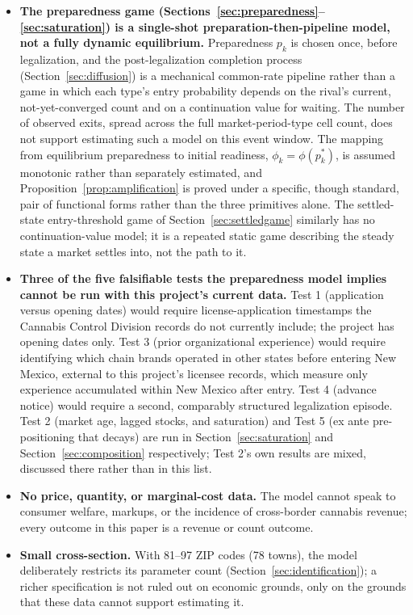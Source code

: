 \documentclass[english,12pt]{article}
\begin{document}
\begin{itemize}
\item \textbf{The preparedness game (Sections~\ref{sec:preparedness}--\ref{sec:saturation}) is a single-shot preparation-then-pipeline model, not a fully dynamic equilibrium.} Preparedness $p_k$ is chosen once, before legalization, and the post-legalization completion process (Section~\ref{sec:diffusion}) is a mechanical common-rate pipeline rather than a game in which each type's entry probability depends on the rival's current, not-yet-converged count and on a continuation value for waiting. The number of observed exits, spread across the full market-period-type cell count, does not support estimating such a model on this event window. The mapping from equilibrium preparedness to initial readiness, $\phi_k=\phi(p_k^*)$, is assumed monotonic rather than separately estimated, and Proposition~\ref{prop:amplification} is proved under a specific, though standard, pair of functional forms rather than the three primitives alone. The settled-state entry-threshold game of Section~\ref{sec:settledgame} similarly has no continuation-value model; it is a repeated static game describing the steady state a market settles into, not the path to it.
\item \textbf{Three of the five falsifiable tests the preparedness model implies cannot be run with this project's current data.} Test 1 (application versus opening dates) would require license-application timestamps the Cannabis Control Division records do not currently include; the project has opening dates only. Test 3 (prior organizational experience) would require identifying which chain brands operated in other states before entering New Mexico, external to this project's licensee records, which measure only experience accumulated within New Mexico after entry. Test 4 (advance notice) would require a second, comparably structured legalization episode. Test 2 (market age, lagged stocks, and saturation) and Test 5 (ex ante pre-positioning that decays) are run in Section~\ref{sec:saturation} and Section~\ref{sec:composition} respectively; Test 2's own results are mixed, discussed there rather than in this list.
\item \textbf{No price, quantity, or marginal-cost data.} The model cannot speak to consumer welfare, markups, or the incidence of cross-border cannabis revenue; every outcome in this paper is a revenue or count outcome.
\item \textbf{Small cross-section.} With 81--97 ZIP codes (78 towns), the model deliberately restricts its parameter count (Section~\ref{sec:identification}); a richer specification is not ruled out on economic grounds, only on the grounds that these data cannot support estimating it.
\end{itemize}
\end{document}
